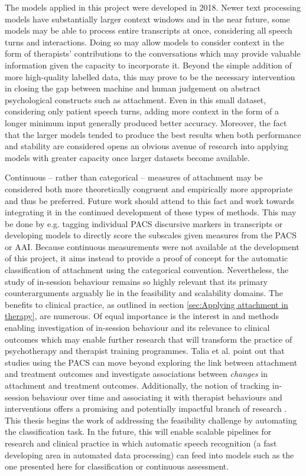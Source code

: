\documentclass[12pt]{report}
\begin{document}
The models applied in this project were developed in 2018. Newer text processing models have substantially larger context windows and in the near future, some models may be able to process entire transcripts at once, considering all speech turns and interactions.
Doing so may allow models to consider context in the form of therapists' contributions to the conversations which may provide valuable information given the capacity to incorporate it.
Beyond the simple addition of more high-quality labelled data, this may prove to be the necessary intervention in closing the gap between machine and human judgement on abstract psychological constructs such as attachment.
Even in this small dataset, considering only patient speech turns, adding more context in the form of a longer minimum input generally produced better accuracy.
Moreover, the fact that the larger models tended to produce the best results when both performance and stability are considered opens an obvious avenue of research into applying models with greater capacity once larger datasets become available.

Continuous -- rather than categorical -- measures of attachment may be considered both more theoretically congruent and empirically more appropriate and thus be preferred.
Future work should attend to this fact and work towards integrating it in the continued development of these types of methods.
This may be done by e.g. tagging individual PACS discursive markers in transcripts or developing models to directly score the subscales given measures from the PACS or AAI.
Because continuous measurements were not available at the development of this project, it aims instead to provide a proof of concept for the automatic classification of attachment using the categorical convention.
Nevertheless, the study of in-session behaviour remains so highly relevant that its primary counterarguments arguably lie in the feasibility and scalability domains.
The benefits to clinical practice, as outlined in section \ref{sec:Applying attachment in therapy}, are numerous.
Of equal importance is the interest in and methods enabling investigation of in-session behaviour and its relevance to clinical outcomes which may enable further research that will transform the practice of psychotherapy and therapist training programmes.
Talia et al. \citeyear{Talia2017} point out that studies using the PACS can move beyond exploring the link between attachment and treatment outcomes and investigate associations between \textit{changes} in attachment and treatment outcomes.
Additionally, the notion of tracking in-session behaviour over time and associating it with therapist behaviours and interventions offers a promising and potentially impactful branch of research \cite{Slade2016, Talia2017}.
This thesis begins the work of addressing the feasibility challenge by automating the classification task.
In the future, this will enable scalable pipelines for research and clinical practice in which automatic speech recognition (a fast developing area in automated data processing) can feed into models such as the one presented here for classification or continuous assessment.
\end{document}
